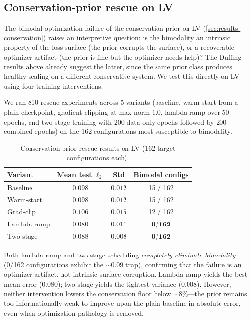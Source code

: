 \documentclass[11pt]{article}
\begin{document}
\subsection{Conservation-prior rescue on LV}
\label{sec:conservation-rescue}

The bimodal optimization failure of the conservation prior on LV (\cref{sec:results-conservation}) raises an interpretive question: is the bimodality an intrinsic property of the loss surface (the prior corrupts the surface), or a recoverable optimizer artifact (the prior is fine but the optimizer needs help)?
The Duffing results above already suggest the latter, since the same prior class produces healthy scaling on a different conservative system.
We test this directly on LV using four training interventions.

We ran 810 rescue experiments across 5 variants (baseline, warm-start from a plain checkpoint, gradient clipping at max-norm $1.0$, lambda-ramp over 50 epochs, and two-stage training with 200 data-only epochs followed by 200 combined epochs) on the 162 configurations most susceptible to bimodality.

\begin{table}[H]
    \centering
    \caption{Conservation-prior rescue results on LV (162 target configurations each).}
    \label{tab:rescue}
    \small
    \begin{tabular}{lccc}
        \toprule
        Variant & Mean test $\ell_2$ & Std & Bimodal configs \\
        \midrule
        Baseline    & $0.098$ & $0.012$ & 15 / 162 \\
        Warm-start  & $0.098$ & $0.012$ & 15 / 162 \\
        Grad-clip   & $0.106$ & $0.015$ & 12 / 162 \\
        Lambda-ramp & $\mathbf{0.080}$ & $0.011$ & $\mathbf{0 / 162}$ \\
        Two-stage   & $0.088$ & $\mathbf{0.008}$ & $\mathbf{0 / 162}$ \\
        \bottomrule
    \end{tabular}
\end{table}

Both lambda-ramp and two-stage scheduling \emph{completely eliminate bimodality} (0/162 configurations exhibit the $\sim\!0.09$ trap), confirming that the failure is an optimizer artifact, not intrinsic surface corruption.
Lambda-ramp yields the best mean error ($0.080$); two-stage yields the tightest variance ($0.008$).
However, neither intervention lowers the conservation floor below $\sim\!8\%$---the prior remains too informationally weak to improve upon the plain baseline in absolute error, even when optimization pathology is removed.
\end{document}
